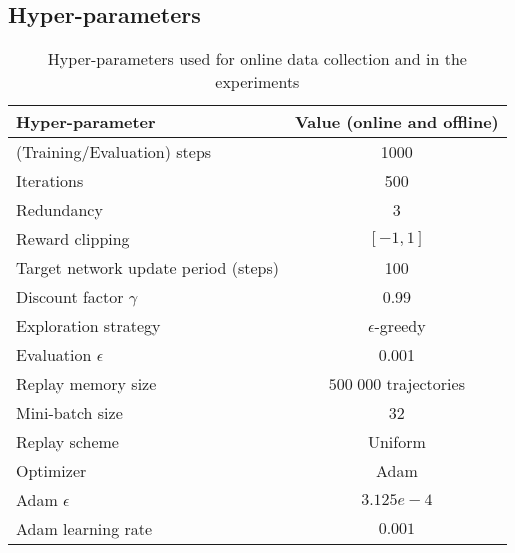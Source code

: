 \subsection{Hyper-parameters}\label{sec:appendix_hparams}

\begin{table*}[t]
\centering
\caption{Hyper-parameters used for online data collection and in the experiments}\label{table:hyperp}
\begin{tabular}{lcc}
\toprule
Hyper-parameter                      & \multicolumn{2}{c}{Value (online and offline)}             \\
\hline
(Training/Evaluation) steps          & \multicolumn{2}{c}{1000}                                   \\
Iterations                           & \multicolumn{2}{c}{500}                                    \\
Redundancy                           & \multicolumn{2}{c}{3}                                      \\
Reward clipping                      & \multicolumn{2}{c}{$[-1,1]$}                               \\
Target network update period (steps) & \multicolumn{2}{c}{100}                                    \\
Discount factor $\gamma$             & \multicolumn{2}{c}{0.99}                                   \\
Exploration strategy                 & \multicolumn{2}{c}{$\epsilon$-greedy}                      \\
Evaluation $\epsilon$                & \multicolumn{2}{c}{0.001}                                  \\
Replay memory size                   & \multicolumn{2}{c}{$500\; 000$ trajectories}               \\
Mini-batch size                      & \multicolumn{2}{c}{32}                                     \\
Replay scheme                        & \multicolumn{2}{c}{Uniform}                                \\
Optimizer                            & \multicolumn{2}{c}{Adam}                                   \\
Adam $\epsilon$                      & \multicolumn{2}{c}{$3.125e-4$}                             \\
Adam learning rate                   & \multicolumn{2}{c}{$0.001$}                                \\

\end{tabular}
\end{table*}
